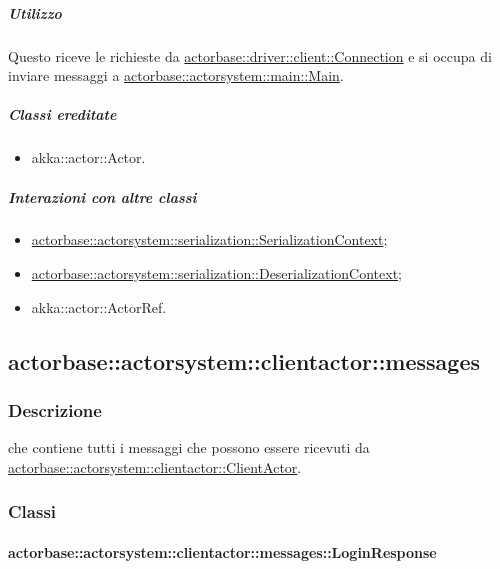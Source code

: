 \documentclass{scalatekids-article}
\begin{document}
\subparagraph{Utilizzo}

Questo  riceve le richieste da \hyperref[sec:actorbase::driver::client::Connection]{actorbase::driver::client::Connection}
e si occupa di inviare messaggi a \hyperref[sec:actorbase::actorsystem::main::Main]{actorbase::actorsystem::main::Main}.

\subparagraph{Classi ereditate}

\begin{itemize}

\item akka::actor::Actor.

\end{itemize}

\subparagraph{Interazioni con altre classi}

\begin{itemize}
\item \hyperref[sec:actorbase::actorsystem::serialization::SerializationContext]{actorbase::actorsystem::serialization::SerializationContext};
\item \hyperref[sec:actorbase::actorsystem::serialization::DeserializationContext]{actorbase::actorsystem::serialization::DeserializationContext};
\item akka::actor::ActorRef.
\end{itemize}

\subsection{actorbase::actorsystem::clientactor::messages}
\label{sec:actorbase::actorsystem::clientactor::messages}

\subsubsection{Descrizione}

 che contiene tutti i messaggi che possono essere ricevuti da
\hyperref[sec:actorbase::actorsystem::clientactor::ClientActor]{actorbase::actorsystem::clientactor::ClientActor}.

\subsubsection{Classi}

\paragraph{actorbase::actorsystem::clientactor::messages::LoginResponse}
\label{sec:actorbase::actorsystem::clientactor::messages::LoginResponse}
\end{document}
